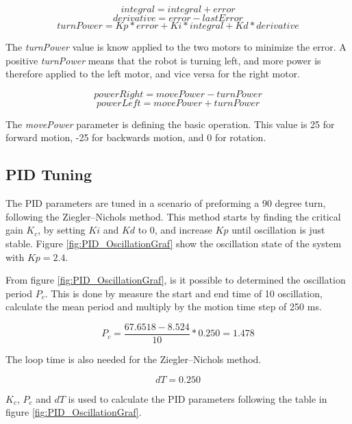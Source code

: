 $$ integral = integral + error $$
$$ derivative = error - lastError $$
$$ turnPower = Kp * error + Ki * integral + Kd * derivative $$

The \emph{turnPower} value is know applied to the two motors to minimize the error.
A positive \emph{turnPower} means that the robot is turning left, and more power is therefore applied to the left motor, and vice versa for the right motor.

$$ powerRight = movePower - turnPower $$
$$ powerLeft = movePower + turnPower $$

The \emph{movePower} parameter is defining the basic operation.
This value is 25 for forward motion, -25 for backwards motion, and 0 for rotation.

\subsection{PID Tuning}

The PID parameters are tuned in a scenario of preforming a 90 degree turn, following the Ziegler–Nichols method.
This method starts by finding the critical gain \emph{$K_c$}, by setting \emph{$Ki$} and \emph{$Kd$} to 0, and increase \emph{$Kp$} until oscillation is just stable.
Figure \ref{fig:PID_OscillationGraf} show the oscillation state of the system with \emph{$Kp = 2.4$}.


From figure \ref{fig:PID_OscillationGraf}, is it possible to determined the oscillation period \emph{$P_c$}.
This is done by measure the start and end time of 10 oscillation, calculate the mean period and multiply by the motion time step of 250 ms.

$$ P_c = \frac{67.6518-8.524}{10} * 0.250 = 1.478 $$

The loop time is also needed for the Ziegler–Nichols method.

$$ dT = 0.250 $$




\emph{$K_c$}, \emph{$P_c$} and \emph{$dT$} is used to calculate the PID parameters following the table in figure \ref{fig:PID_OscillationGraf}.

